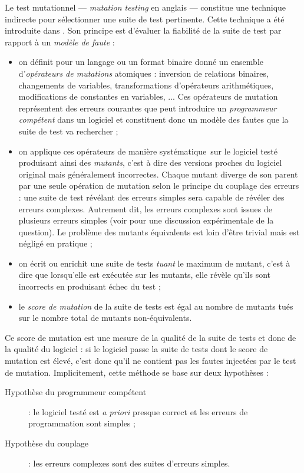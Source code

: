 Le test mutationnel --- \emph{mutation testing} en anglais ---
constitue une
technique indirecte pour s\'electionner une suite de test pertinente.
Cette technique a \'et\'e introduite dans
\cite{demillo-mutation}. Son principe est d'\'evaluer la
fiabilit\'e de la suite de test par rapport \`a un \emph{mod\`ele
  de faute} : 
\begin{itemize}
  \item on d\'efinit pour un langage ou un format binaire donn\'e un
    ensemble d'\emph{op\'erateurs de mutations} atomiques : inversion
    de relations binaires, changements de variables, transformations
    d'op\'erateurs arithm\'etiques, modifications de constantes en
    variables, ... Ces op\'erateurs de mutation repr\'esentent  des
    erreurs courantes que peut introduire un \emph{programmeur
      comp\'etent} dans un logiciel et constituent donc un mod\`ele
    des fautes que la suite de test va rechercher ;
  \item on applique ces op\'erateurs de mani\`ere \og
    syst\'ematique~\fg sur le logiciel test\'e produisant ainsi des
    \emph{mutants}, c'est \`a dire des versions proches du logiciel
    original mais g\'en\'eralement incorrectes. Chaque mutant diverge de son parent par
    une seule op\'eration de mutation selon le principe du couplage
    des erreurs : une suite de test r\'ev\'elant des erreurs simples
    sera capable de r\'ev\'eler des erreurs complexes. Autrement
    dit, les erreurs complexes sont issues de plusieurs erreurs simples
    (voir \cite{offutt-coupling} pour une discussion exp\'erimentale de
    la question). Le probl\`eme des mutants \'equivalents  est loin d'\^etre trivial mais
    est n\'eglig\'e en pratique ;
  \item on \'ecrit ou enrichit une suite de tests \emph{tuant}
    le maximum de mutant, c'est \`a dire que lorsqu'elle est
    ex\'ecut\'ee sur les mutants, elle r\'ev\`ele qu'ils sont
    incorrects en produisant \'echec du test ;
\item le \emph{score de mutation} de la suite de tests est \'egal au
  nombre de mutants tu\'es sur le nombre total de mutants non-\'equivalents.
\end{itemize}
Ce score de mutation est une mesure de la qualit\'e de la suite de
tests et donc de la qualit\'e du logiciel : si le logiciel  passe la
suite de tests dont le score de mutation est \'elev\'e, c'est donc
qu'il ne contient pas les fautes inject\'ees par le test de
mutation. Implicitement, cette m\'ethode se base sur deux
hypoth\`eses :
\begin{description}
  \item[Hypoth\`ese du programmeur comp\'etent] : le logiciel
  test\'e est \emph{a priori} presque correct et les erreurs de
  programmation sont simples ;
\item[Hypoth\`ese du couplage] : les erreurs complexes sont des
  suites d'erreurs simples.
\end{description}

